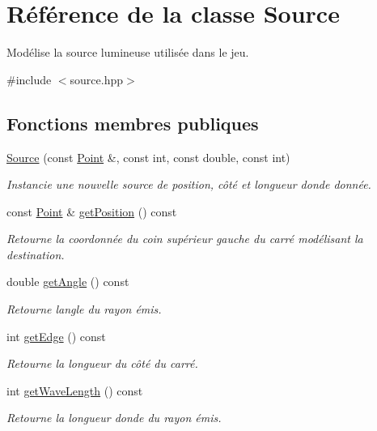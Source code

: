 \hypertarget{classSource}{}\section{Référence de la classe Source}
\label{classSource}


Modélise la source lumineuse utilisée dans le jeu.  




{\ttfamily \#include $<$source.\+hpp$>$}

\subsection*{Fonctions membres publiques}
\begin{DoxyCompactItemize}
\item 
\hyperlink{classSource_a57e5f78dc14db333535f1f83b0c2fb63}{Source} (const \hyperlink{classPoint}{Point} \&, const int, const double, const int)
\begin{DoxyCompactList}\small\item\em Instancie une nouvelle source de position, côté et longueur d\textquotesingle{}onde donnée. \end{DoxyCompactList}\item 
const \hyperlink{classPoint}{Point} \& \hyperlink{classSource_a3a934cb50b20015ed142070893fb9661}{get\+Position} () const 
\begin{DoxyCompactList}\small\item\em Retourne la coordonnée du coin supérieur gauche du carré modélisant la destination. \end{DoxyCompactList}\item 
double \hyperlink{classSource_a8e6f805715dbadf4784dcfcf60b8fb6a}{get\+Angle} () const 
\begin{DoxyCompactList}\small\item\em Retourne l\textquotesingle{}angle du rayon émis. \end{DoxyCompactList}\item 
int \hyperlink{classSource_a0db163e078500dd3fea9bb3b67d832f3}{get\+Edge} () const 
\begin{DoxyCompactList}\small\item\em Retourne la longueur du côté du carré. \end{DoxyCompactList}\item 
int \hyperlink{classSource_ab316229f3514eb474313d87daff6ba26}{get\+Wave\+Length} () const 
\begin{DoxyCompactList}\small\item\em Retourne la longueur d\textquotesingle{}onde du rayon émis. \end{DoxyCompactList}\item 

\end{DoxyCompactItemize}
